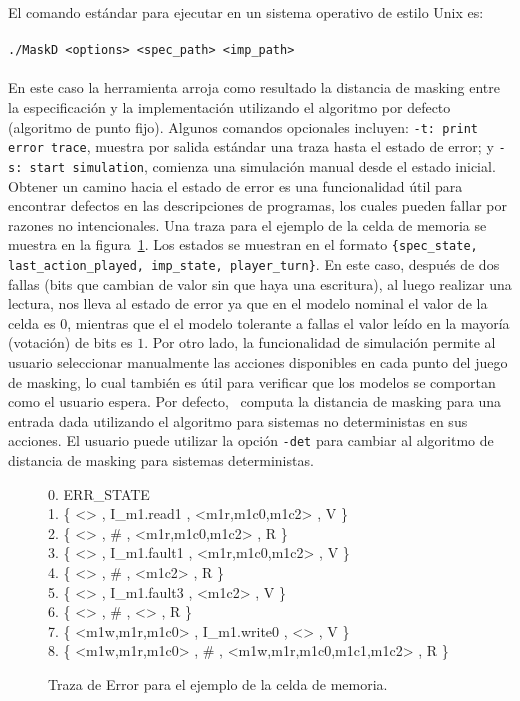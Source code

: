 El comando estándar para ejecutar {\MaskD} en un sistema operativo de estilo Unix es:
\\ 
\\
 \verb"./MaskD <options> <spec_path> <imp_path>"
\\
\\
    En este caso la herramienta arroja como resultado la distancia de masking entre la especificación y la implementación utilizando el algoritmo por defecto (algoritmo de punto fijo).
Algunos comandos opcionales incluyen: \verb"-t: print error trace", muestra por salida estándar una traza hasta el estado de error; y  \verb"-s: start simulation", comienza una simulación manual desde el estado inicial.  
    Obtener un camino hacia el estado de error es una funcionalidad útil para encontrar defectos en las descripciones de programas, los cuales pueden fallar por razones no intencionales. Una traza para el ejemplo de la celda de memoria se muestra en la figura~\ref{fig:trace_mem_cell}. Los estados se muestran en el formato \verb"{spec_state, last_action_played, imp_state, player_turn}". En este caso, después de dos fallas (bits que cambian de valor sin que haya una escritura), al luego realizar una lectura, nos lleva al estado de error ya que en el modelo nominal el valor de la celda es $0$, mientras que el el modelo tolerante a fallas el valor leído en la mayoría (votación) de bits es $1$. Por otro lado, la funcionalidad de simulación permite al usuario seleccionar manualmente las acciones disponibles en cada punto del juego de masking, lo cual también es útil para verificar que los modelos se comportan como el usuario espera.
    Por defecto, \MaskD~computa la distancia de masking para una entrada dada utilizando el algoritmo para sistemas no deterministas en sus acciones. 
El usuario puede utilizar la opción \verb"-det" para cambiar al algoritmo de distancia de masking para sistemas deterministas.
\begin{figure}[t]
\centering
\begin{minipage}[t]{.47\textwidth}
\fontsize{10}{10}\selectfont\ttfamily
\begin{tabbing}
0. ERR\_STATE\\
1. \{ <> , I\_m1.read1 , <m1r,m1c0,m1c2> , V \} \\
2. \{ <> , \# , <m1r,m1c0,m1c2> , R \} \\ 
3. \{ <> , I\_m1.fault1 , <m1r,m1c0,m1c2> , V \} \\
4. \{ <> , \# , <m1c2> , R \} \\ 
5. \{ <> , I\_m1.fault3 , <m1c2> , V \} \\
6. \{ <> , \# , <> , R \} \\ 
7. \{ <m1w,m1r,m1c0> , I\_m1.write0 , <> , V \} \\
8. \{ <m1w,m1r,m1c0> , \# , <m1w,m1r,m1c0,m1c1,m1c2> , R \} \\ 
\end{tabbing}
\end{minipage}
\caption{Traza de Error para el ejemplo de la celda de memoria.} \label{fig:trace_mem_cell}
\end{figure}


